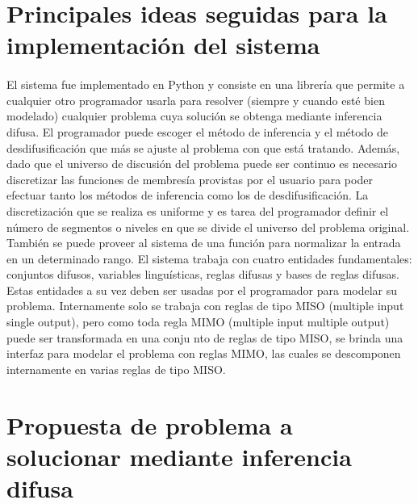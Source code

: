\documentclass[a4paper,10pt,twocolumn]{article}
\begin{document}

\section{Principales ideas seguidas para la implementación del sistema}\label{sec:2}

  \paragraph{} El sistema fue implementado en Python y consiste en una librería que permite a cualquier otro programador usarla para
  resolver (siempre y cuando esté bien modelado) cualquier problema cuya solución se obtenga mediante inferencia difusa. El programador
  puede escoger el método de inferencia y el método de desdifusificación que más se ajuste al problema con que está tratando. Además, dado que
  el universo de discusión del problema puede ser continuo es necesario discretizar las funciones de membresía provistas por el usuario
  para poder efectuar tanto los métodos de inferencia como los de desdifusificación. La discretización que se realiza es uniforme y es tarea del
  programador definir el número de segmentos o niveles en que se divide el universo del problema original. También se puede proveer al sistema de
  una función para normalizar la entrada en un determinado rango. El sistema trabaja con cuatro entidades fundamentales: conjuntos difusos, variables
  linguísticas, reglas difusas y bases de reglas difusas. Estas entidades a su vez deben ser usadas por el programador para modelar su problema. Internamente solo
  se trabaja con reglas de tipo MISO (multiple input single output), pero como toda regla MIMO (multiple input multiple output) puede ser transformada en una conju
  nto de reglas de tipo MISO, se brinda una interfaz para modelar el problema con reglas MIMO, las cuales se descomponen internamente en varias reglas de tipo MISO.   


\section{Propuesta de problema a solucionar mediante inferencia difusa}\label{sec:3}
\end{document}
